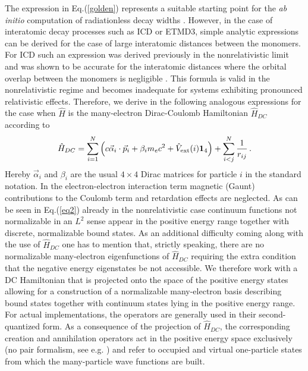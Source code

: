The expression in Eq.(\ref{golden}) represents a suitable starting point for
the {\it ab initio} computation of radiationless decay widths \cite{Howat82,Averbukh09_2}.
However, in the case of interatomic decay processes such as ICD or ETMD3,
simple analytic expressions can be derived for the case of large interatomic
distances between the monomers. For ICD such an expression was derived previously
in the nonrelativistic limit and was shown to be accurate for the interatomic
distances where the orbital overlap between the monomers is
negligible \cite{Averbukh04,Gokhberg10_1}. This formula is valid in the nonrelativistic
regime and becomes inadequate for systems exhibiting pronounced relativistic effects.
Therefore, we derive in the following analogous expressions for the case
when $\hat{H}$ is the many-electron Dirac-Coulomb Hamiltonian $\hat{H}_{DC}$ according
to
\begin{equation}
    \hat{H}_{DC}=\sum_{i=1}^N\left(c\vec{\alpha}_i\cdot\vec{p}_i + \beta_i m_ec^2 +
   \hat{V}_{\rm ext}(i){\bf{1}}_4\right) + \sum_{i<j}^N\frac{1}{r_{ij}}\, .
\end{equation}
Hereby $\vec{\alpha}_i$ and $\beta_i$ are the usual $4\times 4$ Dirac matrices
for particle $i$ in the standard notation.
In the electron-electron interaction term magnetic (Gaunt) contributions to
the Coulomb term and retardation effects are neglected. As can be seen in
Eq.(\ref{eq2}) already in the nonrelativistic case continuum functions not
normalizable in an $L^2$ sense appear in the positive energy range together with
discrete, normalizable bound states. As an additional difficulty coming along with
the use of $\hat{H}_{DC}$ one has to mention that, strictly speaking, there are no
normalizable many-electron eigenfunctions of $\hat{H}_{DC}$
\cite{brown51, sucher80, pestka2006, bylicki2008} requiring the extra condition
that the negative energy eigenstates be not accessible. We therefore work with a
DC Hamiltonian that is projected onto the space of the positive energy states
allowing for a construction of a normalizable many-electron basis describing
bound states together with continuum states lying in the positive energy range.
For actual implementations, the operators are generally used in their second-quantized
form. As a consequence of the projection of $\hat{H}_{DC}$, the corresponding
creation and annihilation operators act in the positive energy space exclusively
(no pair formalism, see e.g. \cite{grant88}) and refer to occupied and virtual
one-particle states from which the many-particle wave functions are built.

